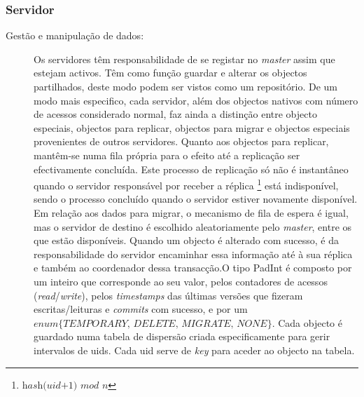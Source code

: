 \subsubsection{Servidor}

\begin{description}

\item[Gestão e manipulação de dados:]
Os servidores têm responsabilidade de se registar no \textit{master} assim que estejam activos. Têm como função guardar e alterar os objectos partilhados, deste modo podem ser vistos como um repositório. De um modo mais especifico, cada servidor, além dos objectos nativos com número de acessos considerado normal, faz ainda a distinção entre objecto especiais, objectos para replicar, objectos para migrar e objectos especiais provenientes de outros servidores. Quanto aos objectos para replicar, mantêm-se numa fila própria para o efeito até a replicação ser efectivamente concluída. Este processo de replicação só não é instantâneo quando o servidor responsável por receber a réplica \footnote{$ \textit{hash(uid+1) mod n} $} está indisponível, sendo o processo concluído quando o servidor estiver novamente disponível. Em relação aos dados para migrar, o mecanismo de fila de espera é igual, mas o servidor de destino é escolhido aleatoriamente pelo \textit{master}, entre os que estão disponíveis. Quando um objecto é alterado com sucesso, é da responsabilidade do servidor encaminhar essa informação até à sua réplica e também ao coordenador dessa transacção.O tipo PadInt é composto por um inteiro que corresponde ao seu valor, pelos contadores de acessos (\textit{read}/\textit{write}), pelos \textit{timestamps} das últimas versões que fizeram escritas/leituras e \textit{commits} com sucesso, e por um $\textit{enum\{TEMPORARY, DELETE, MIGRATE, NONE\}}$. Cada objecto é guardado numa tabela de dispersão criada especificamente para gerir intervalos de uids. Cada uid serve de \textit{key} para aceder ao objecto na tabela. 


\end{description}
